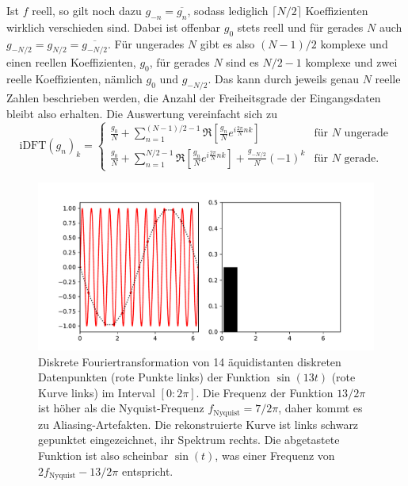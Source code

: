 Ist $f$ reell, so gilt noch dazu $g_{-n} = \overline{g_{n}}$, sodass lediglich
$\lceil N/2\rceil$ Koeffizienten wirklich verschieden sind. Dabei ist offenbar $g_0$ stets reell und für gerades $N$ auch $g_{-N/2} = g_{N/2} = \overline{g_{-N/2}}$. Für ungerades $N$ gibt es also $(N-1)/2$ komplexe und einen reellen Koeffizienten, $g_0$, für gerades $N$ sind es $N/2-1$ komplexe und zwei reelle Koeffizienten, nämlich $g_0$ und $g_{-N/2}$. Das kann durch jeweils genau $N$ reelle Zahlen beschrieben werden, die Anzahl der Freiheitsgrade der Eingangsdaten bleibt also erhalten. Die Auswertung vereinfacht sich zu
\begin{equation}
  \text{iDFT}(g_n)_k = \begin{cases}
  	\frac{g_0}{N} + \sum\limits_{n=1}^{(N-1)/2-1} \Re\left[\frac{g_n}{N} e^{i \frac{2\pi}{N} n k}\right] & \text{für }N\text{ ungerade} \\
  	\frac{g_0}{N} + \sum\limits_{n=1}^{N/2-1} \Re\left[\frac{g_n}{N} e^{i \frac{2\pi}{N} n k}\right] +
	\frac{g_{-N/2}}{N} (-1)^k
	& \text{für }N\text{ gerade}.
  \end{cases}
\end{equation}

\begin{figure}
  \centering
  \includegraphics[width=\textwidth]{plots/fftalias}
  \caption{Diskrete Fouriertransformation von 14 äquidistanten
    diskreten Datenpunkten (rote Punkte links) der Funktion
    $\sin(13t)$ (rote Kurve links) im Interval $[0:2\pi]$.  Die
    Frequenz der Funktion $13/2\pi$ ist höher als die Nyquist-Frequenz
    $f_\text{Nyquist}=7/2\pi$, daher kommt es zu
    Aliasing-Artefakten. Die rekonstruierte Kurve ist links schwarz
    gepunktet eingezeichnet, ihr Spektrum rechts. Die abgetastete
    Funktion ist also scheinbar $\sin(t)$, was einer Frequenz von
    $2f_\text{Nyquist} - 13/2\pi$ entspricht.}
  \label{fig:fourieralias}
\end{figure}

